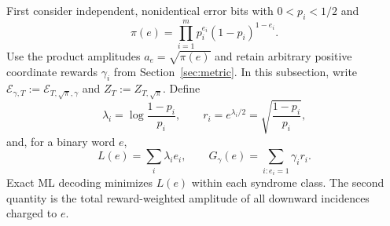 \documentclass[journal]{IEEEtran}
\theoremstyle{definition}
\theoremstyle{remark}
\begin{document}
First consider independent, nonidentical error bits with
$0<p_i<1/2$ and
\begin{equation}
 \pi(e)=\prod_{i=1}^m p_i^{e_i}(1-p_i)^{1-e_i}.
 \label{eq:product-prior}
\end{equation}
Use the product amplitudes $a_e=\sqrt{\pi(e)}$ and retain arbitrary positive
coordinate rewards $\gamma_i$ from Section~\ref{sec:metric}.
In this subsection, write
$\mathcal E_{\gamma,T}:=\mathcal E_{T,\sqrt{\pi},\gamma}$ and
$Z_T:=Z_{T,\sqrt{\pi}}$.
Define
\begin{equation}
 \lambda_i=\log\frac{1-p_i}{p_i},\qquad
 r_i=e^{\lambda_i/2}=\sqrt{\frac{1-p_i}{p_i}},
 \label{eq:lambda-r}
\end{equation}
and, for a binary word $e$,
\begin{equation}
 L(e)=\sum_i\lambda_i e_i,\qquad
 G_\gamma(e)=\sum_{i:e_i=1}\gamma_i r_i.
 \label{eq:L-G}
\end{equation}
Exact ML decoding minimizes $L(e)$ within each syndrome class.  The second
quantity is the total reward-weighted amplitude of all downward incidences
charged to $e$.
\end{document}
